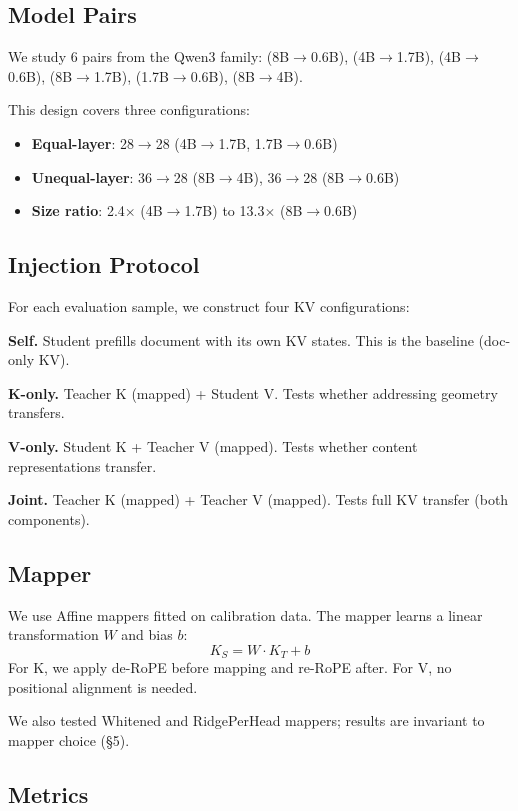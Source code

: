 \subsection{Model Pairs}

We study 6 pairs from the Qwen3 family:
(8B$\to$0.6B), (4B$\to$1.7B), (4B$\to$0.6B),
(8B$\to$1.7B), (1.7B$\to$0.6B), (8B$\to$4B).

This design covers three configurations:
\begin{itemize}
  \item \textbf{Equal-layer}: 28$\to$28 (4B$\to$1.7B, 1.7B$\to$0.6B)
  \item \textbf{Unequal-layer}: 36$\to$28 (8B$\to$4B), 36$\to$28 (8B$\to$0.6B)
  \item \textbf{Size ratio}: 2.4$\times$ (4B$\to$1.7B) to 13.3$\times$ (8B$\to$0.6B)
\end{itemize}

\subsection{Injection Protocol}

For each evaluation sample, we construct four KV configurations:

\textbf{Self.}
Student prefills document with its own KV states.
This is the baseline (doc-only KV).

\textbf{K-only.}
Teacher K (mapped) + Student V.
Tests whether addressing geometry transfers.

\textbf{V-only.}
Student K + Teacher V (mapped).
Tests whether content representations transfer.

\textbf{Joint.}
Teacher K (mapped) + Teacher V (mapped).
Tests full KV transfer (both components).

\subsection{Mapper}

We use Affine mappers fitted on calibration data.
The mapper learns a linear transformation $W$ and bias $b$:
\[
K_S = W \cdot K_T + b
\]
For K, we apply de-RoPE before mapping and re-RoPE after.
For V, no positional alignment is needed.

We also tested Whitened and RidgePerHead mappers;
results are invariant to mapper choice (§5).

\subsection{Metrics}

